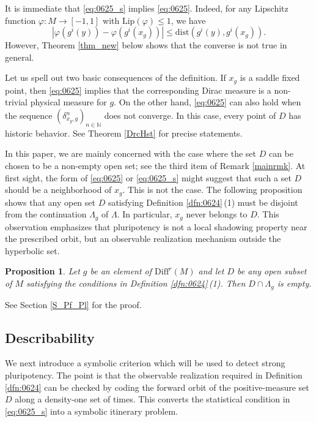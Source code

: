 \documentclass{amsart}
\newtheorem{prop}[thm]{Proposition}
\theoremstyle{definition}
\numberwithin{equation}{section}
\numberwithin{figure}{section}
\begin{document}
It is immediate that \eqref{eq:0625_s} implies \eqref{eq:0625}. Indeed, for any Lipschitz function $\varphi:M\longrightarrow [-1,1]$ with $\mathrm{Lip}(\varphi)\leq 1$, we have
\[
|\varphi(g^i(y))-\varphi(g^i(x_g))|
\leq \mathrm{dist}(g^i(y),g^i(x_g)).
\]
However, Theorem \ref{thm_new} below shows that the converse is not true in general.


Let us spell out two basic consequences of the definition. If $x_g$ is a saddle fixed point, then \eqref{eq:0625} implies that the corresponding Dirac measure is a non-trivial physical measure for $g$. On the other hand, \eqref{eq:0625} can also hold when the sequence $(\delta _{x_g, g}^n)_{n\in \mathbb N}$ does not converge. In this case, every point of $D$ has historic behavior. See Theorem \ref{DrcHst} for precise statements.


\medskip

In this paper, we are mainly concerned with the case where the set $D$ can be chosen to be a non-empty open set; see the third item of Remark \ref{mainrmk}. 
At first sight, the form of \eqref{eq:0625} or \eqref{eq:0625_s} might suggest that such a set $D$ should be a neighborhood of $x_g$. 
This is not the case. The following proposition shows that any open set $D$ satisfying Definition \ref{dfn:0624}\,(1) must be disjoint from the continuation $\Lambda_g$ of $\Lambda$. In particular, $x_g$ never belongs to $D$. 
This observation emphasizes that pluripotency is not a local shadowing property near the prescribed orbit, but an observable realization mechanism outside the hyperbolic set.

\begin{prop}\label{p_D_open}
Let $g$ be an element of $\mathrm{Diff}^r(M)$ and let $D$ be any open subset of $M$ satisfying the conditions in Definition \ref{dfn:0624}\,(1).
Then $D\cap \Lambda_g$ is empty.
\end{prop}

See Section \ref{S_Pf_Pl} for the proof.

\subsection{Describability}

We next introduce a symbolic criterion which will be used to detect strong pluripotency. 
The point is that the observable realization required in Definition \ref{dfn:0624} can be checked by coding the forward orbit of the positive-measure set $D$ along a density-one set of times. 
This converts the statistical condition in \eqref{eq:0625_s} into a symbolic itinerary problem.
\end{document}
